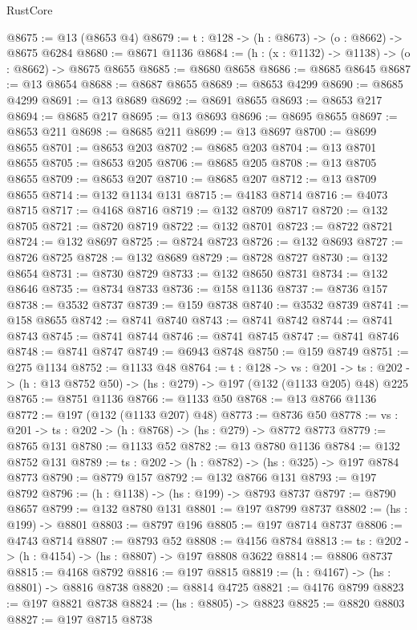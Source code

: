 \begin{lexlean}{RustCore}
\begin{coremodule}
@8675 := @13 (@8653 @4)
@8679 := {t : @128} -> (h : @8673) -> (o : @8662) -> @8675 @6284
@8680 := @8671 @1136
@8684 := (h : (x : @1132) -> @1138) -> (o : @8662) -> @8675 @8655
@8685 := @8680 @8658
@8686 := @8685 @8645
@8687 := @13 @8654
@8688 := @8687 @8655
@8689 := @8653 @4299
@8690 := @8685 @4299
@8691 := @13 @8689
@8692 := @8691 @8655
@8693 := @8653 @217
@8694 := @8685 @217
@8695 := @13 @8693
@8696 := @8695 @8655
@8697 := @8653 @211
@8698 := @8685 @211
@8699 := @13 @8697
@8700 := @8699 @8655
@8701 := @8653 @203
@8702 := @8685 @203
@8704 := @13 @8701 @8655
@8705 := @8653 @205
@8706 := @8685 @205
@8708 := @13 @8705 @8655
@8709 := @8653 @207
@8710 := @8685 @207
@8712 := @13 @8709 @8655
@8714 := @132 @1134 @131
@8715 := @4183 @8714
@8716 := @4073 @8715
@8717 := @4168 @8716
@8719 := @132 @8709 @8717
@8720 := @132 @8705
@8721 := @8720 @8719
@8722 := @132 @8701
@8723 := @8722 @8721
@8724 := @132 @8697
@8725 := @8724 @8723
@8726 := @132 @8693
@8727 := @8726 @8725
@8728 := @132 @8689
@8729 := @8728 @8727
@8730 := @132 @8654
@8731 := @8730 @8729
@8733 := @132 @8650 @8731
@8734 := @132 @8646
@8735 := @8734 @8733
@8736 := @158 @1136
@8737 := @8736 @157
@8738 := @3532 @8737
@8739 := @159 @8738
@8740 := @3532 @8739
@8741 := @158 @8655
@8742 := @8741 @8740
@8743 := @8741 @8742
@8744 := @8741 @8743
@8745 := @8741 @8744
@8746 := @8741 @8745
@8747 := @8741 @8746
@8748 := @8741 @8747
@8749 := @6943 @8748
@8750 := @159 @8749
@8751 := @275 @1134
@8752 := @1133 @48
@8764 := {t : @128} ->
  {vs : @201} ->
  {ts : @202} -> (h : @13 @8752 @50) -> (hs : @279) -> @197 (@132 (@1133 @205) @48) @225
@8765 := @8751 @1136
@8766 := @1133 @50
@8768 := @13 @8766 @1136
@8772 := @197 (@132 (@1133 @207) @48)
@8773 := @8736 @50
@8778 := {vs : @201} -> {ts : @202} -> (h : @8768) -> (hs : @279) -> @8772 @8773
@8779 := @8765 @131
@8780 := @1133 @52
@8782 := @13 @8780 @1136
@8784 := @132 @8752 @131
@8789 := {ts : @202} -> (h : @8782) -> (hs : @325) -> @197 @8784 @8773
@8790 := @8779 @157
@8792 := @132 @8766 @131
@8793 := @197 @8792
@8796 := (h : @1138) -> (hs : @199) -> @8793 @8737
@8797 := @8790 @8657
@8799 := @132 @8780 @131
@8801 := @197 @8799 @8737
@8802 := (hs : @199) -> @8801
@8803 := @8797 @196
@8805 := @197 @8714 @8737
@8806 := @4743 @8714
@8807 := @8793 @52
@8808 := @4156 @8784
@8813 := {ts : @202} -> (h : @4154) -> (hs : @8807) -> @197 @8808 @3622
@8814 := @8806 @8737
@8815 := @4168 @8792
@8816 := @197 @8815
@8819 := (h : @4167) -> (hs : @8801) -> @8816 @8738
@8820 := @8814 @4725
@8821 := @4176 @8799
@8823 := @197 @8821 @8738
@8824 := (hs : @8805) -> @8823
@8825 := @8820 @8803
@8827 := @197 @8715 @8738

\end{coremodule}
\end{lexlean}
